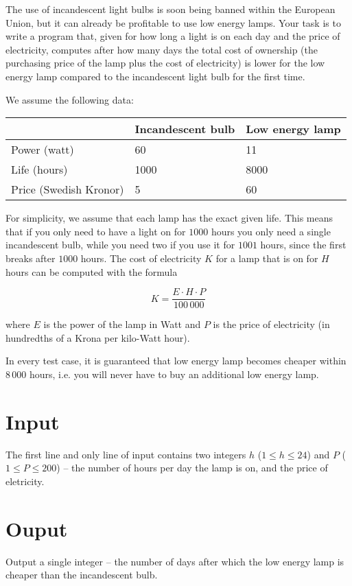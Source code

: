 The use of incandescent light bulbs is soon being banned within the European Union, but it can already be profitable to use low energy lamps.
Your task is to write a program that, given for how long a light is on each day and the price of electricity, computes after how many days the total cost of ownership (the purchasing price of the lamp plus the cost of electricity) is lower for the low energy lamp compared to the incandescent light bulb for the first time.

We assume the following data:

\noindent
\begin{tabular}{|l|l|l|}
\hline
& Incandescent bulb & Low energy lamp \\ \hline
Power (watt)           & 60                & 11             \\ \hline
Life (hours)           & 1000              & 8000           \\ \hline
Price (Swedish Kronor) & 5                 & 60             \\ \hline
\end{tabular}

For simplicity, we assume that each lamp has the exact given life.
This means that if you only need to have a light on for $1000$ hours you only need a single incandescent bulb, while you need two if you use it for $1001$ hours, since the first breaks after $1000$ hours.
The cost of electricity $K$ for a lamp that is on for $H$ hours can be computed with the formula

$$ K = \frac{E \cdot H \cdot P}{100\,000} $$

where $E$ is the power of the lamp in Watt and $P$ is the price of electricity (in hundredths of a Krona per kilo-Watt hour).

In every test case, it is guaranteed that low energy lamp becomes cheaper within $8\,000$ hours, i.e. you will never have to buy an additional low energy lamp.

\section*{Input}
The first line and only line of input contains two integers $h$ ($1 \le h \le 24$) and $P$ ($1 \le P \le 200$) -- the number of hours per day the lamp is on, and the price of eletricity.

\section*{Ouput}
Output a single integer -- the number of days after which the low energy lamp is cheaper than the incandescent bulb.

